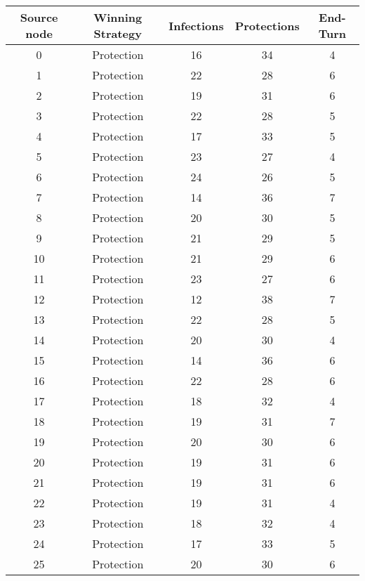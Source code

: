 \documentclass[results.tex]{subfiles}
\begin{document}
\begin{center}
  \begin{tabular}{| c || c | c | c | c |}
    \hline
    {\bfseries Source node} & {\bfseries Winning Strategy} & {\bfseries Infections} & {\bfseries Protections} & {\bfseries End-Turn} \\  %
    \hline\hline
    0 & Protection & 16 & 34 & 4 \\ 
    \hline
    1 & Protection & 22 & 28 & 6 \\ 
    \hline
    2 & Protection & 19 & 31 & 6 \\ 
    \hline
    3 & Protection & 22 & 28 & 5 \\ 
    \hline
    4 & Protection & 17 & 33 & 5 \\ 
    \hline
    5 & Protection & 23 & 27 & 4 \\ 
    \hline
    6 & Protection & 24 & 26 & 5 \\ 
    \hline
    7 & Protection & 14 & 36 & 7 \\ 
    \hline
    8 & Protection & 20 & 30 & 5 \\ 
    \hline
    9 & Protection & 21 & 29 & 5 \\ 
    \hline
    10 & Protection & 21 & 29 & 6 \\ 
    \hline
    11 & Protection & 23 & 27 & 6 \\ 
    \hline
    12 & Protection & 12 & 38 & 7 \\ 
    \hline
    13 & Protection & 22 & 28 & 5 \\ 
    \hline
    14 & Protection & 20 & 30 & 4 \\ 
    \hline
    15 & Protection & 14 & 36 & 6 \\ 
    \hline
    16 & Protection & 22 & 28 & 6 \\ 
    \hline
    17 & Protection & 18 & 32 & 4 \\ 
    \hline
    18 & Protection & 19 & 31 & 7 \\ 
    \hline
    19 & Protection & 20 & 30 & 6 \\ 
    \hline
    20 & Protection & 19 & 31 & 6 \\ 
    \hline
    21 & Protection & 19 & 31 & 6 \\ 
    \hline
    22 & Protection & 19 & 31 & 4 \\ 
    \hline
    23 & Protection & 18 & 32 & 4 \\ 
    \hline
    24 & Protection & 17 & 33 & 5 \\ 
    \hline
    25 & Protection & 20 & 30 & 6 \\ 

\end{tabular}
\end{center}
\end{document}
